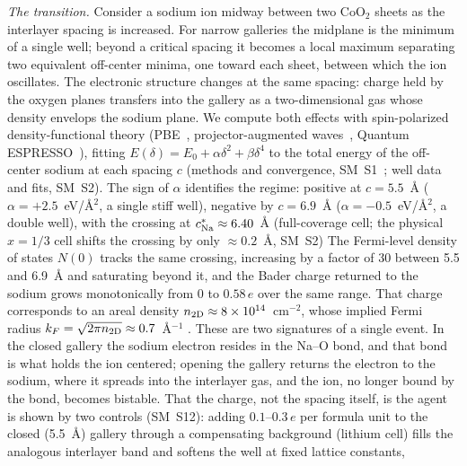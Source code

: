\documentclass[aps,prl,twocolumn,superscriptaddress,floatfix]{revtex4-2}
\begin{document}
\textit{The transition.} Consider a sodium ion midway between two CoO$_2$ sheets as the interlayer
spacing is increased. For narrow galleries the midplane is the minimum of a single well; beyond a
critical spacing it becomes a local maximum separating two equivalent off-center minima, one
toward each sheet, between which the ion oscillates. The electronic structure changes at the same
spacing: charge held by the oxygen planes transfers into the gallery as a two-dimensional gas
whose density envelops the sodium plane. We compute both effects with spin-polarized
density-functional theory (PBE~\cite{PBE1996}, projector-augmented waves~\cite{Blochl1994},
Quantum ESPRESSO~\cite{QE2017}), fitting $E(\delta)=E_0+\alpha\delta^2+\beta\delta^4$ to the
total energy of the off-center sodium at each spacing $c$ (methods and convergence,
SM~S1~\cite{Note1}; well data and fits, SM~S2). The sign of $\alpha$
identifies the regime: positive at $c=5.5$~\AA{} ($\alpha=+2.5$~eV/\AA$^2$, a single stiff well),
negative by $c=6.9$~\AA{} ($\alpha=-0.5$~eV/\AA$^2$, a double well), with the crossing at
$c^\ast_{\rm Na}\approx6.40$~\AA{} (full-coverage cell; the physical $x=1/3$ cell shifts the
crossing by only $\approx0.2$~\AA, SM~S2) The Fermi-level density of states $N(0)$ tracks the same
crossing, increasing by a factor of 30 between 5.5 and 6.9~\AA{} and saturating beyond it, and the
Bader charge returned to the sodium grows monotonically from 0 to $0.58\,e$ over the same range.
That charge corresponds to an areal density $n_{\rm 2D}\approx8\times10^{14}$~cm$^{-2}$, whose
implied Fermi radius $k_F=\sqrt{2\pi n_{\rm 2D}}\approx0.7$~\AA$^{-1}$ . These are two signatures of a single
event. In the closed gallery the sodium electron resides in the Na--O bond, and that bond is what
holds the ion centered; opening the gallery returns the electron to the sodium, where it spreads
into the interlayer gas, and the ion, no longer bound by the bond, becomes bistable. That the
charge, not the spacing itself, is the agent is shown by two controls (SM~S12): adding
$0.1$--$0.3\,e$ per formula unit to the closed (5.5~\AA) gallery through a compensating
background (lithium cell) fills the analogous interlayer band and softens the well at fixed lattice
constants, 
\end{document}
